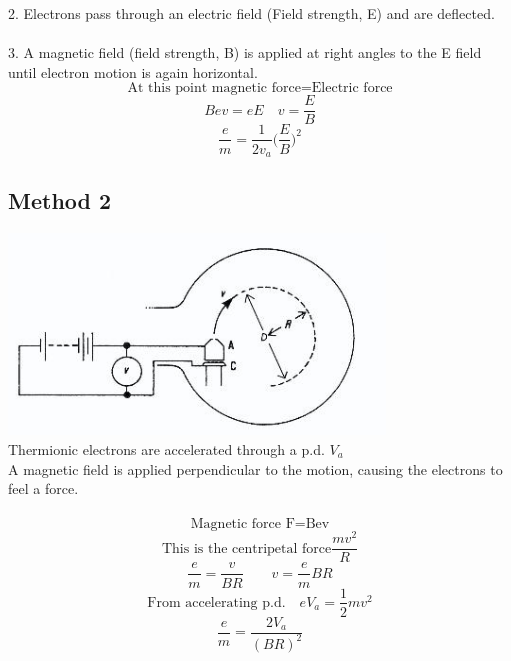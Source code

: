 \documentclass[12pt]{article}
\begin{document}
2. Electrons pass through an electric field (Field strength, E) and are deflected.\\
\\
3. A magnetic field (field strength, B) is applied at right angles to the E field until electron motion is again horizontal.
$$\textrm{At this point magnetic force=Electric force}$$
$$Bev=eE \quad v=\frac{E}{B}$$
$$\frac{e}{m}=\frac{1}{2v_a}\Bigg(\frac{E}{B}\Bigg)^2$$
\subsection{Method 2}
\includegraphics[width=10cm]{circluar_path.jpg}\\
Thermionic electrons are accelerated through a p.d. $V_a$\\
A magnetic field is applied perpendicular to the motion, causing the electrons to feel a force.\\
\\
$$\textrm{Magnetic force   F=Bev}$$
$$\textrm{This is the centripetal force} \frac{mv^2}{R}$$
$$\frac{e}{m}=\frac{v}{BR} \quad \quad v=\frac{e}{m}BR$$
$$\textrm{From accelerating p.d.}\quad eV_a=\frac{1}{2}mv^2$$
$$\frac{e}{m}=\frac{2V_a}{(BR)^2}$$
\end{document}
